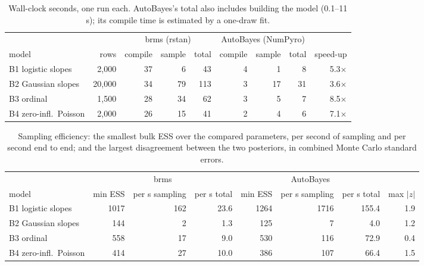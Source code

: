 \documentclass[11pt]{article}
\begin{document}
\begin{table}[h]\centering\footnotesize\setlength{\tabcolsep}{4pt}
\caption{Wall-clock seconds, one run each. AutoBayes's total also includes building the model (0.1--11 s); its compile time is estimated by a one-draw fit.}
\begin{tabular}{@{}lrrrrrrrr@{}}
\toprule
& & \multicolumn{3}{c}{brms (rstan)} & \multicolumn{3}{c}{AutoBayes (NumPyro)} & \\
\cmidrule(lr){3-5}\cmidrule(lr){6-8}
model & rows & compile & sample & total & compile & sample & total & speed-up \\
\midrule
B1 logistic slopes & 2,000 & 37 & 6 & 43 & 4 & 1 & 8 & 5.3$\times$ \\
B2 Gaussian slopes & 20,000 & 34 & 79 & 113 & 3 & 17 & 31 & 3.6$\times$ \\
B3 ordinal & 1,500 & 28 & 34 & 62 & 3 & 5 & 7 & 8.5$\times$ \\
B4 zero-infl.\ Poisson & 2,000 & 26 & 15 & 41 & 2 & 4 & 6 & 7.1$\times$ \\
\bottomrule
\end{tabular}
\end{table}

\begin{table}[h]\centering\footnotesize\setlength{\tabcolsep}{4pt}
\caption{Sampling efficiency: the smallest bulk ESS over the compared parameters, per second of sampling and per
second end to end; and the largest disagreement between the two posteriors, in combined Monte Carlo standard errors.}
\begin{tabular}{@{}lrrrrrrr@{}}
\toprule
& \multicolumn{3}{c}{brms} & \multicolumn{3}{c}{AutoBayes} & \\
\cmidrule(lr){2-4}\cmidrule(lr){5-7}
model & min ESS & per s sampling & per s total & min ESS & per s sampling & per s total & max $|z|$ \\
\midrule
B1 logistic slopes & 1017 & 162 & 23.6 & 1264 & 1716 & 155.4 & 1.9 \\
B2 Gaussian slopes & 144 & 2 & 1.3 & 125 & 7 & 4.0 & 1.2 \\
B3 ordinal & 558 & 17 & 9.0 & 530 & 116 & 72.9 & 0.4 \\
B4 zero-infl.\ Poisson & 414 & 27 & 10.0 & 386 & 107 & 66.4 & 1.5 \\
\bottomrule
\end{tabular}
\end{table}
\end{document}
